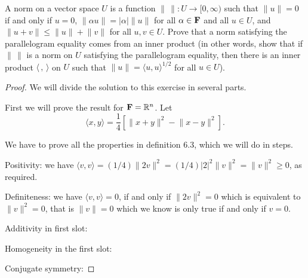 \begin{exercise}{21}
  A norm on a vector space $U$ is a function $\lVert\,\rVert:U\to[0,\infty)$ such that $\lVert u\rVert=0$ if and only if $u=0$, $\lVert\alpha u\rVert= \lvert\alpha \rvert\lVert u\rVert$ for all $\alpha\in\mathbf{F}$ and all $u\in U$, and $\lVert u+v\rVert\leq \lVert u\rVert +\lVert v\rVert$ for all $u,v\in U$. Prove that a norm satisfying the parallelogram equality comes from an inner product (in other words, show that if $\lVert\,\rVert$ is a norm on $U$ satisfying the parallelogram equality, then there is an inner product $\langle\, ,\,\rangle$ on $U$ such that $\lVert u\rVert=\langle u,u\rangle^{1/2}$ for all $u\in U$).
\end{exercise}
\begin{proof}
 We will divide the solution to this exercise in several parts.

 First we will prove the result for $\mathbf{F}=\mathbb{R}^n$. Let 
 \[ \langle x,y\rangle =\frac{1}{4}[\lVert x+y\rVert^2- \lVert x-y\rVert^2]. \]

 We have to prove all the properties in definition 6.3, which we will do in steps.

 Positivity: we have $\langle v,v\rangle = (1/4)\lVert 2v\rVert^2= (1/4)\lvert 2\rvert^2\lVert v\rVert^2= \lVert v\rVert^2\geq 0$, as required.

 Definiteness: we have $\langle v,v\rangle=0$, if and only if $\lVert 2v\rVert^2=0$ which is equivalent to $\lVert v\rVert^2=0$, that is $\lVert v\rVert =0$ which we know is only true if and only if $v=0$.

 Additivity in first slot: 

 Homogeneity in the first slot:

 Conjugate symmetry: 
\end{proof}
